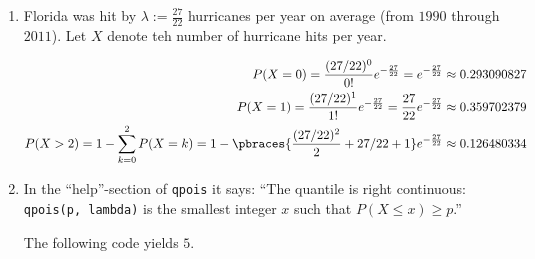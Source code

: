 \begin{solution}

\phantom{}

\begin{enumerate}[label = (\alph*)]

    \item Florida was hit by $\lambda := \frac{27}{22}$ hurricanes per year on average (from $1990$ through $2011$).
    Let $X$ denote teh number of hurricane hits per year.

    \begin{align}
        P(X = 0)
        =
        \frac{(27 / 22)^0}{0!} e^{-\frac{27}{22}}
        =
        e^{-\frac{27}{22}}
        \approx
        0.293090827 \\
        P(X = 1)
        =
        \frac{(27 / 22)^1}{1!} e^{-\frac{27}{22}}
        =
        \frac{27}{22} e^{-\frac{27}{22}}
        \approx
        0.359702379 \\
        P(X > 2)
        =
        1 - \sum_{k=0}^2 P(X = k)
        =
        1 - \pbraces
        {
            \frac{(27 / 22)^2}{2} + 27 / 22 + 1
        }
        e^{-\frac{27}{22}}
        \approx
        0.126480334
    \end{align}

    \item In the \enquote{help}-section of \texttt{qpois} it says:
    \enquote{The quantile is right continuous: \texttt{qpois(p, lambda)} is the smallest integer $x$ such that $P(X \leq x) \geq p$.}

    The following code yields $5$.

    

\end{enumerate}

\end{solution}

